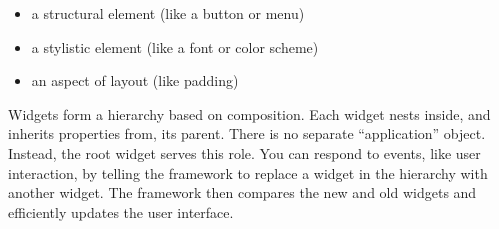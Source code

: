 \begin{itemize}
  \item a structural element (like a button or menu)
  \item a stylistic element (like a font or color scheme)
  \item an aspect of layout (like padding)
\end{itemize}
Widgets form a hierarchy based on composition. Each widget nests inside, and inherits properties from, its parent. There is no separate “application” object. Instead, the root widget serves this role. You can respond to events, like user interaction, by telling the framework to replace a widget in the hierarchy with another widget. The framework then compares the new and old widgets and efficiently updates the user interface. \cite{ha002}
